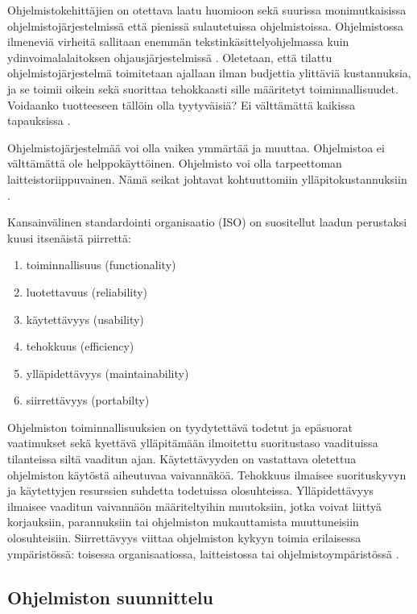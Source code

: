 \documentclass[finnish]{tktltiki2}
\theoremstyle{definition}
\theoremstyle{remark}
\begin{document}
Ohjelmistokehittäjien on otettava laatu huomioon sekä suurissa monimutkaisissa ohjelmistojärjestelmissä että pienissä sulautetuissa ohjelmistoissa. Ohjelmistossa ilmeneviä virheitä sallitaan enemmän tekstinkäsittelyohjelmassa kuin ydinvoimalalaitoksen ohjausjärjestelmissä \cite{KIP96}. Oletetaan, että tilattu ohjelmistojärjestelmä toimitetaan ajallaan ilman budjettia ylittäviä kustannuksia, ja se toimii oikein sekä suorittaa tehokkaasti sille määritetyt toiminnallisuudet. Voidaanko tuotteeseen tällöin olla tyytyväisiä? Ei välttämättä kaikissa tapauksissa \cite{BBL76}.

Ohjelmistojärjestelmää voi olla vaikea ymmärtää ja muuttaa. Ohjelmistoa ei välttämättä ole helppokäyttöinen. Ohjelmisto voi olla tarpeettoman laitteistoriippuvainen. Nämä seikat johtavat kohtuuttomiin ylläpitokustannuksiin \cite{BBL76}.       

Kansainvälinen standardointi organisaatio (ISO) on suositellut laadun perustaksi kuusi itsenäistä piirrettä:

\begin{enumerate}
  \item toiminnallisuus (functionality)
  \item luotettavuus (reliability)
  \item käytettävyys (usability)
  \item tehokkuus (efficiency)
  \item ylläpidettävyys (maintainability)
  \item siirrettävyys (portabilty) \cite{KIP96}
\end{enumerate}

Ohjelmiston toiminnallisuuksien on tyydytettävä todetut ja epäsuorat vaatimukset sekä kyettävä ylläpitämään ilmoitettu suoritustaso vaadituissa tilanteissa siltä vaaditun ajan. Käytettävyyden on vastattava oletettua ohjelmiston käytöstä aiheutuvaa vaivannäköä. Tehokkuus ilmaisee suorituskyvyn ja käytettyjen resurssien suhdetta todetuissa olosuhteissa. Ylläpidettävyys ilmaisee vaaditun vaivannäön määriteltyihin muutoksiin, jotka voivat liittyä korjauksiin, parannuksiin tai ohjelmiston mukauttamista muuttuneisiin olosuhteisiin. Siirrettävyys viittaa ohjelmiston kykyyn toimia erilaisessa ympäristössä: toisessa organisaatiossa, laitteistossa tai ohjelmistoympäristössä \cite{KIP96}.

\subsection{Ohjelmiston suunnittelu}
\end{document}
